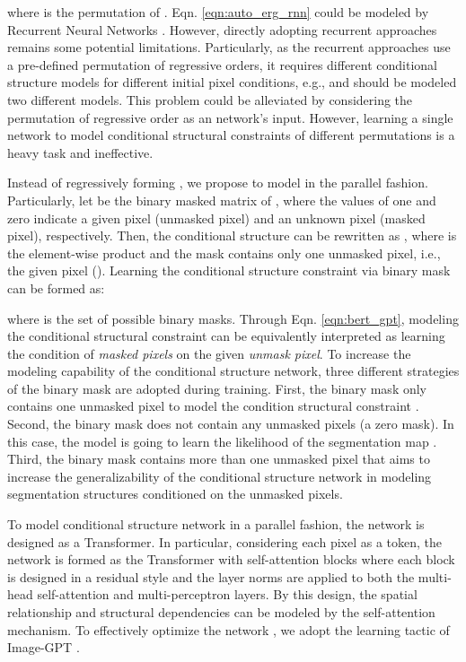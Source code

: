 \documentclass[10pt,twocolumn,letterpaper]{article}
\begin{document}
where  is the permutation of . Eqn. \eqref{eqn:auto_erg_rnn} could be modeled by Recurrent Neural Networks \cite{oord2016pixel}. However, directly adopting recurrent approaches remains some potential limitations.
Particularly, as the recurrent approaches use a pre-defined permutation of regressive orders, it requires different conditional structure models for different initial pixel conditions, e.g.,  and  should be modeled two different models.
This problem could be alleviated by considering the permutation of regressive order
as an network's input. However, learning a single network to model conditional structural constraints of different permutations is a heavy task and ineffective.

Instead of regressively forming , we propose to model  in the parallel fashion. 
Particularly, let  be the binary masked matrix of , where
the values of one and zero indicate a given pixel (unmasked pixel) and an unknown pixel (masked pixel), respectively. 
Then, the conditional structure  can be rewritten as , 
where  is the element-wise product and the mask  contains only one unmasked pixel, i.e., the given  pixel ().
Learning the conditional structure constraint via binary mask  can be formed as: 

where  is the set of possible binary masks. 
Through Eqn. \eqref{eqn:bert_gpt}, modeling the conditional structural constraint 
can be equivalently interpreted as learning the condition of \textit{masked pixels} on the given \textit{unmask pixel}.
To increase the modeling capability of the conditional structure network, three different strategies of the binary mask are adopted during training.
First, the binary mask only contains one unmasked pixel to model the condition structural constraint .
Second, the binary mask does not contain any unmasked pixels (a zero mask). In this case, the model is going to learn the likelihood of the segmentation map .
Third, the binary mask contains more than one unmasked pixel that aims to increase the generalizability of the conditional structure network in modeling segmentation structures conditioned on the unmasked pixels.

To model conditional structure network  in a parallel fashion, the network  is designed as a Transformer.
In particular, considering each pixel as a token, the network  is formed as the Transformer with  self-attention blocks where each block is designed in a residual style and the layer norms are applied to both the multi-head self-attention and multi-perceptron layers.
By this design, the spatial relationship and structural dependencies 
can be modeled by the self-attention mechanism.
To effectively optimize the network , we adopt the learning tactic of Image-GPT \cite{chen2020generative}.
\end{document}
